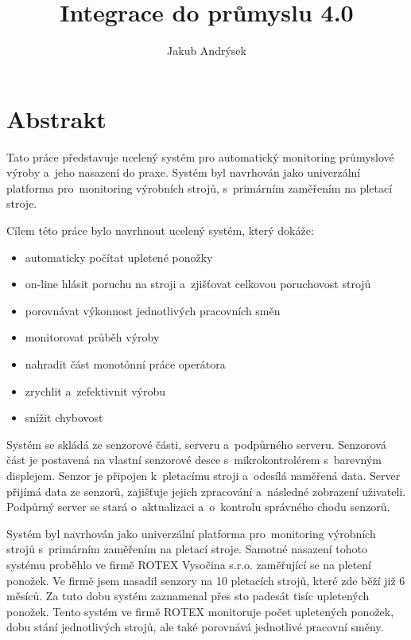 \documentclass[12pt, a4paper]{article}
\title{Integrace do průmyslu 4.0}
\author{Jakub Andrýsek}
\date{}
\begin{document}

\maketitle

\section*{Abstrakt}
Tato práce představuje ucelený systém pro automatický monitoring průmyslové výroby a~jeho nasazení do praxe.
Systém byl navrhován jako univerzální platforma pro~monitoring výrobních strojů, s~primárním zaměřením na pletací stroje.

Cílem této práce bylo navrhnout ucelený systém, který dokáže:

\begin{itemize}
    \item automaticky počítat upletené ponožky
    \item on-line hlásit poruchu na stroji a~zjišťovat celkovou poruchovost strojů
    \item porovnávat výkonnost jednotlivých pracovních směn
    \item monitorovat průběh výroby
    \item nahradit část monotónní práce operátora
    \item zrychlit a~zefektivnit výrobu
    \item snížit chybovost
\end{itemize}

Systém se skládá ze senzorové části, serveru a~podpůrného serveru.
Senzorová část je postavená na vlastní senzorové desce s~mikrokontrolérem s~barevným displejem. Senzor je připojen k~pletacímu stroji a~odesílá naměřená data.
Server přijímá  data ze senzorů, zajišťuje jejich zpracování a~následné zobrazení uživateli.
Podpůrný server se stará o~aktualizaci a~o~kontrolu správného chodu senzorů.

Systém byl navrhován jako univerzální platforma pro~monitoring výrobních strojů s~pri\-már\-ním zaměřením na pletací stroje. 
Samotné nasazení tohoto systému proběhlo ve firmě ROTEX Vysočina s.r.o. zaměřující se na pletení ponožek. 
Ve firmě jsem nasadil senzory na 10 pletacích strojů, které zde běží již 6 měsíců. 
Za tuto dobu systém zaznamenal přes sto padesát tisíc upletených ponožek.
Tento systém ve firmě ROTEX monitoruje počet upletených ponožek, dobu stání jednotlivých strojů, ale také porovnává jednotlivé pracovní směny.
\end{document}

